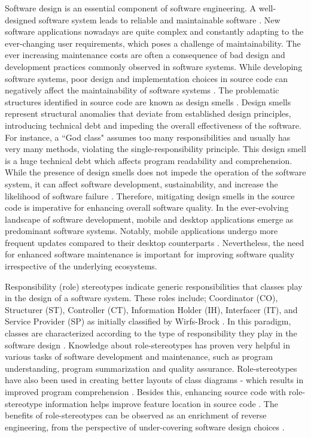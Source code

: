 \documentclass[AMA,Times1COL]{WileyNJDv5} %
\begin{document}
Software design is an essential component of software engineering. A well-designed software system leads to reliable and maintainable software \cite{imran2019design, imran2022qualitative}. New software applications nowadays are quite complex and constantly adapting to the ever-changing user requirements, which poses a challenge of maintainability. The ever increasing maintenance costs \cite{jha2019deep} are often a consequence of bad design and development practices commonly observed in software systems. While developing software systems, poor design and implementation choices in source code can negatively affect the maintainability of software systems \cite{palomba2018diffuseness}. The problematic structures identified in source code are known as design smells \cite{kaur2015influence,aversano2020empirical,imran2022qualitative}. Design smells represent structural anomalies that deviate from established design principles, introducing technical debt and impeding the overall effectiveness of the software. For instance, a ``God class" assumes too many responsibilities and usually has very many methods, violating the single-responsibility principle. This design smell is a huge technical debt which affects program readability and comprehension. While the presence of design smells does not impede the operation of the software system, it can affect software development, sustainability, and increase the likelihood of software failure \cite{turkistani2019reducing}. Therefore, mitigating design smells in the source code is imperative for enhancing overall software quality. In the ever-evolving landscape of software development, mobile and desktop applications emerge as predominant software systems. Notably, mobile applications undergo more frequent updates compared to their desktop counterparts \cite{mcilroy2016fresh}. Nevertheless, the need for enhanced software maintenance is important for improving software quality irrespective of the underlying ecosystems. 

Responsibility (role) stereotypes indicate generic responsibilities that classes play in the design of a software system. These roles include; Coordinator (CO), Structurer (ST), Controller (CT), Information Holder (IH), Interfacer (IT), and Service Provider (SP) as initially classified by Wirfs-Brock \cite{wirfs2006characterizing}. In this paradigm, classes are characterized according to the type of responsibility they play in the software design \cite{wirfs2006characterizing}. Knowledge about role-stereotypes has proven very helpful in various tasks of software development and maintenance, such as program understanding, program summarization and quality assurance. Role-stereotypes have also been used in creating better layouts of class diagrams - which results in improved program comprehension \cite{genero2008does,nurwidyantoro2019automated, sharif2009effect,ho2022role}.  Besides this, enhancing source code with role-stereotype information helps improve feature location in source code \cite{alhindawi2013improving}. The benefits of role-stereotypes can be observed as an enrichment of reverse engineering, from the perspective of under-covering software design choices \cite{nurwidyantoro2019automated, ho2022role}.
\end{document}
